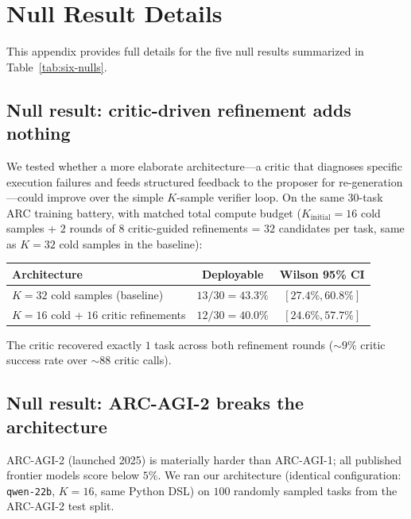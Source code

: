 \documentclass[11pt]{amsart}
\newcommand\1{{\mathds{1}}}
\theoremstyle{definition}
\theoremstyle{remark}
\numberwithin{equation}{section}
\begin{document}
\section{Null Result Details}\label{app:null-details}

This appendix provides full details for the five null results summarized in Table~\ref{tab:six-nulls}.

\subsection{Null result: critic-driven refinement adds nothing}\label{app:critic}

We tested whether a more elaborate architecture---a critic that diagnoses specific execution failures and feeds structured feedback to the proposer for re-generation---could improve over the simple $K$-sample verifier loop.
On the same $30$-task ARC training battery, with matched total compute budget ($K_\text{initial}\!=\!16$ cold samples + $2$ rounds of $8$ critic-guided refinements = $32$ candidates per task, same as $K\!=\!32$ cold samples in the baseline):

\begin{center}\small
\begin{tabular}{lcc}
\toprule
Architecture & Deployable & Wilson 95\% CI \\
\midrule
$K\!=\!32$ cold samples (baseline) & $13/30 = 43.3\%$ & $[27.4\%, 60.8\%]$ \\
$K\!=\!16$ cold + $16$ critic refinements & $12/30 = 40.0\%$ & $[24.6\%, 57.7\%]$ \\
\bottomrule
\end{tabular}
\end{center}

The critic recovered exactly $1$ task across both refinement rounds ($\sim\!9\%$ critic success rate over $\sim\!88$ critic calls).

\subsection{Null result: ARC-AGI-2 breaks the architecture}\label{app:arc2}

ARC-AGI-2 (launched 2025) is materially harder than ARC-AGI-1; all published frontier models score below $5\%$.
We ran our architecture (identical configuration: \texttt{qwen-22b}, $K\!=\!16$, same Python DSL) on $100$ randomly sampled tasks from the ARC-AGI-2 test split.
\end{document}
